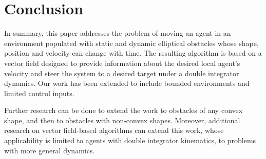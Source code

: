 \section{Conclusion} \label{sec:ccl}

In summary, this paper addresses the problem of moving an agent in an environment populated with static and dynamic elliptical obstacles whose shape, position and velocity can change with time. The resulting algorithm is based on a vector field designed to provide information about the desired local agent's velocity and steer the system to a desired target under a double integrator dynamics.
Our work has been extended to include bounded environments and limited control inputs. 

Further research can be done to extend the work to obstacles of any convex shape, and then to obstacles with non-convex shapes. Moreover, additional research on vector field-based algorithms can extend this work, whose applicability is limited to agents with double integrator kinematics, to problems with more general dynamics.



